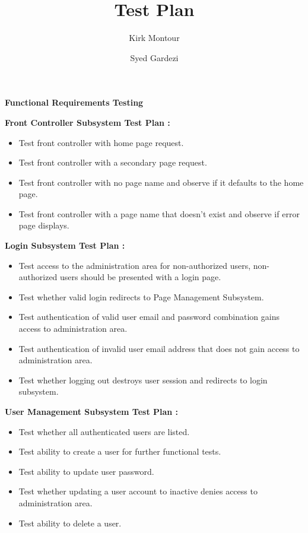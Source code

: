 \documentclass[11pt]{article}
\begin{document}
\title{Test Plan}
\author{Kirk Montour\\ \and Syed Gardezi}


\date{\vspace{-5ex}}

\maketitle
\vspace{5 mm}

\textbf{\Large Functional Requirements Testing}

\vspace{5 mm}

\textbf{Front Controller Subsystem Test Plan :}

\begin{itemize}
\item Test front controller with home page request.
\item Test front controller with a secondary page request.
\item Test front controller with no page name and observe if it defaults to the home page.
\item Test front controller with a page name that doesn’t exist and observe if error page displays.
\end{itemize}

\vspace{2 mm}
\textbf{Login Subsystem Test Plan :}

\begin{itemize}
\item Test access to the administration area for non-authorized users, non-authorized users should be presented with a login page.
\item Test whether valid login redirects to Page Management Subsystem.
\item Test authentication of valid user email and password combination gains access to administration area.
\item Test authentication of invalid user email address that does not gain access to administration area.
\item Test whether logging out destroys user session and redirects to login subsystem.
\end{itemize}

\vspace{2 mm}
\textbf{User Management Subsystem Test Plan :}

\begin{itemize}
\item Test whether all authenticated users are listed.
\item Test ability to create a user for further functional tests.
\item Test ability to update user password.
\item Test whether updating a user account to inactive denies access to administration area.
\item Test ability to delete a user.
\end{itemize}
\end{document}
